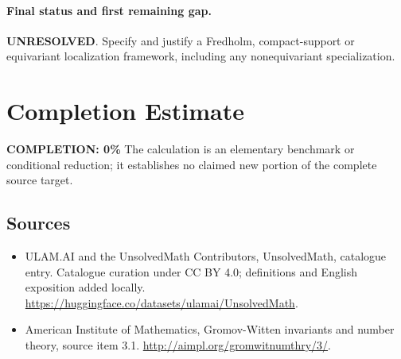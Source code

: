 \documentclass[11pt]{article}
\begin{document}
\paragraph{Final status and first remaining gap.}
\textbf{UNRESOLVED}. Specify and justify a Fredholm, compact-support or equivariant localization framework, including any nonequivariant specialization.

\section{Completion Estimate}
\noindent\textbf{COMPLETION: 0\%}
The calculation is an elementary benchmark or conditional reduction; it establishes no claimed new portion of the complete source target.

\subsection{Sources}
\begin{itemize}
\item[\hypertarget{source:statement:1}{S1}] ULAM.AI and the UnsolvedMath Contributors, UnsolvedMath, catalogue entry. Catalogue curation under CC BY 4.0; definitions and English exposition added locally.
\url{https://huggingface.co/datasets/ulamai/UnsolvedMath}.
\item[\hypertarget{source:statement:2}{S2}] American Institute of Mathematics, Gromov-Witten invariants and number theory, source item 3.1.
\url{http://aimpl.org/gromwitnumthry/3/}.
\end{itemize}
\label{end:statement}
\end{document}
